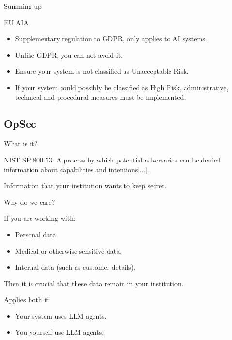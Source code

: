 \documentclass[24pt]{beamer}
\newcommand{\subsectionslide}{
	 \begin{frame}
		\sectionpage
		\subsectionpage
	\end{frame}
}
\begin{document}
\begin{frame}{Summing up}
	\begin{block}{EU AIA}
		\begin{itemize}
			\item Supplementary regulation to GDPR, only applies to AI systems.
			\item Unlike GDPR, you can not avoid it.
			\item Ensure your system is not classified as Unacceptable Risk.
			\item If your system could possibly be classified as High Risk, administrative, technical and procedural measures must be implemented.
		\end{itemize}
	\end{block}
\end{frame}


\subsection{OpSec}
\subsectionslide

\begin{frame}{What is it?}
	\begin{definition}[OpSec]
		NIST SP 800-53: A process by which potential adversaries can be denied information about capabilities and intentions[...].
	\end{definition}
	\pause
	\begin{alertblock}{}
		Information that your institution wants to keep secret.
	\end{alertblock}
\end{frame}

\begin{frame}{Why do we care?}
	\begin{alertblock}{If you are working with:}
		\begin{itemize}
			\item Personal data.
			\item Medical or otherwise sensitive data.
			\item Internal data (such as customer details).
		\end{itemize}
		Then it is \alert{crucial} that these data remain in your institution.
	\end{alertblock}
	
	\begin{block}{Applies both if:}
		\begin{itemize}
			\item Your system uses LLM agents.
			\item You yourself use LLM agents.
		\end{itemize}
	\end{block}
\end{frame}
\end{document}
